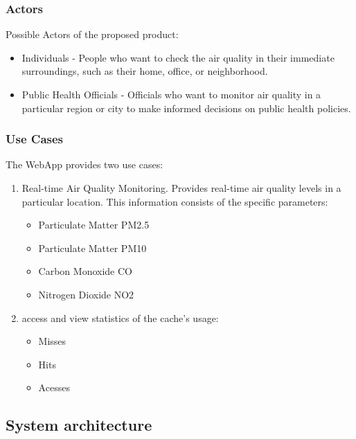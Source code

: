 \documentclass[12pt]{article}
\begin{document}
\subsubsection{Actors}

Possible Actors of the proposed product:

\begin{itemize}

\item Individuals - People who want to check the air quality in their immediate surroundings, such as their home, office, or neighborhood.

\item Public Health Officials - Officials who want to monitor air quality in a particular region or city to make informed decisions on public health policies.

\end{itemize}


\subsubsection{Use Cases}
The WebApp provides two use cases:

\begin{enumerate}

\item  Real-time Air Quality Monitoring. Provides real-time air quality levels in a particular location. This information consists of the specific parameters: 
	\begin{itemize}
		\item Particulate Matter PM2.5
		\item Particulate Matter PM10
		\item Carbon Monoxide CO
		\item Nitrogen Dioxide NO2
	\end{itemize}
	
\item access and view statistics of the cache's usage:
	\begin{itemize}
		\item Misses
		\item Hits
		\item Acesses
	\end{itemize}

\end{enumerate}


\subsection{System architecture}
\end{document}
